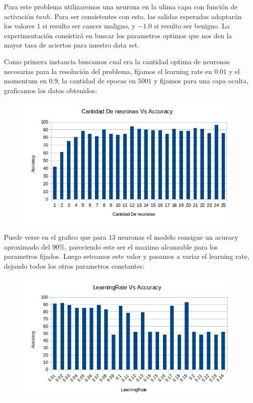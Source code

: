 Para este problema utilizaremos una neurona en la ulima capa con función de activación $tanh$. Para ser consistentes con esto, las salidas esperadas adoptarán los valores $1$ si resulto ser cancer maligno, y $-1.0$ si resulto ser benigno. La experimentación consistirá en buscar los parametros optimos que nos den la mayor tasa de aciertos para nuestro data set.

Como primera instancia buscamos cual era la cantidad optima de neuronas necesarias para la resolución del problema, fijamos el learning rate en $0.01$ y el momentum en $0.9$, la cantidad de epocas en $5001$ y fijamos para una capa oculta, graficamos los datos obtenidos:

\begin{figure}[h!]
  \centering
    \includegraphics[scale=0.4]{ej1/cantNeuronasVsAccuracy.png}
\end{figure}

Puede verse en el grafico que para $13$ neuronas el modelo consigue un acuracy aproximado del $90\%$, pareciendo este ser el maximo alcanzable para los parametros fijados. Luego seteamos este valor y pasamos a variar el learning rate, dejando todos los otros parametros constantes:

\begin{figure}[h!]
  \centering
    \includegraphics[scale=0.4]{ej1/learningRate.png}
\end{figure}


